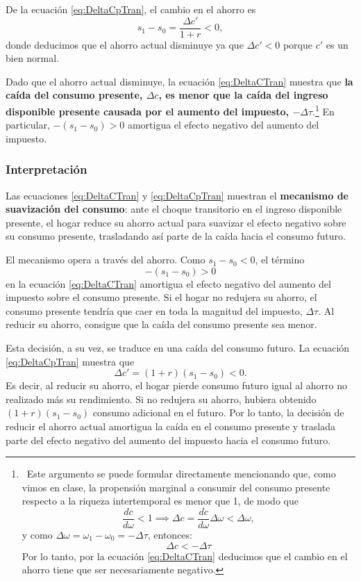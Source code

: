 \documentclass[11pt]{article}
\begin{document}
De la ecuación \eqref{eq:DeltaCpTran}, el cambio en el ahorro es
\begin{equation}
  \boxed{
    s_1-s_0
    =
    \frac{\Delta c'}{1+r}<0,
    \label{eq:DeltasTran}
  }
\end{equation}
donde deducimos que el ahorro actual disminuye ya que $\Delta c' <0$ porque $c'$ es un bien normal.


Dado que el ahorro actual disminuye, la ecuación \eqref{eq:DeltaCTran} muestra que \textbf{la caída del consumo presente, $\Delta c$, es menor que la caída del ingreso disponible presente causada por el aumento del impuesto, $-\Delta \tau$}.\footnote{\ Este argumento se puede formular directamente mencionando que, como vimos en clase, la propensión marginal a consumir del consumo presente respecto a la riqueza intertemporal es menor que 1, de modo que
$$
\frac{dc}{d\omega} < 1 \implies \Delta c = \frac{dc}{d\omega} \Delta \omega < \Delta \omega,
$$
y como $\Delta \omega = \omega_1 - \omega_0 = -\Delta \tau$, entonces:
$$
\Delta c < -\Delta\tau
$$
Por lo tanto, por la ecuación \eqref{eq:DeltaCTran} deducimos que el cambio en el ahorro tiene que ser necesariamente negativo.} En particular, $-(s_1-s_0)>0$ amortigua el efecto negativo del aumento del impuesto.


\subsubsection*{Interpretación}

Las ecuaciones \eqref{eq:DeltaCTran} y \eqref{eq:DeltaCpTran} muestran el \textbf{mecanismo de suavización del consumo}: ante el choque transitorio en el ingreso disponible presente, el hogar reduce su ahorro actual para suavizar el efecto negativo sobre su consumo presente, trasladando así parte de la caída hacia el consumo futuro.


El mecanismo opera a través del ahorro. Como \(s_1-s_0<0\), el término
\[
  -(s_1-s_0)>0
\]
en la ecuación \eqref{eq:DeltaCTran} amortigua el efecto negativo del aumento del impuesto sobre el consumo presente. Si el hogar no redujera su ahorro, el consumo presente tendría que caer en toda la magnitud del impuesto, \(\Delta\tau\). Al reducir su ahorro, consigue que la caída del consumo presente sea menor.

Esta decisión, a su vez, se traduce en una caída del consumo futuro. La ecuación \eqref{eq:DeltaCpTran} muestra que
\[
  \Delta c'=(1+r)(s_1-s_0)<0.
\]
Es decir, al reducir su ahorro, el hogar pierde consumo futuro igual al ahorro no realizado más su rendimiento. Si no redujera su ahorro, hubiera obtenido \((1+r)(s_1-s_0)\) consumo adicional en el futuro. Por lo tanto, la decisión de reducir el ahorro actual amortigua la caída en el consumo presente y traslada parte del efecto negativo del aumento del impuesto hacia el consumo futuro.
\end{document}
